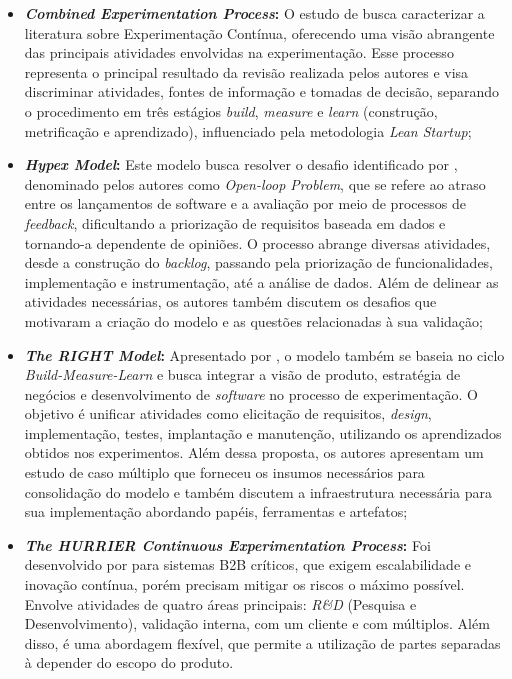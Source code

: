 \begin{itemize}

    \item \textbf{\textit{Combined Experimentation Process}:} O estudo de  busca caracterizar a literatura sobre Experimentação Contínua, oferecendo uma visão abrangente das principais atividades envolvidas na experimentação. Esse processo representa o principal resultado da revisão realizada pelos autores e visa discriminar atividades, fontes de informação e tomadas de decisão, separando o procedimento em três estágios \textit{build}, \textit{measure} e \textit{learn} (construção, metrificação e aprendizado), influenciado pela metodologia \textit{Lean Startup};
    
    \item \textbf{\textit{Hypex Model}:} Este modelo busca resolver o desafio identificado por , denominado pelos autores como \textit{Open-loop Problem}, que se refere ao atraso entre os lançamentos de software e a avaliação por meio de processos de \textit{feedback}, dificultando a priorização de requisitos baseada em dados e tornando-a dependente de opiniões. O processo abrange diversas atividades, desde a construção do \textit{backlog}, passando pela priorização de funcionalidades, implementação e instrumentação, até a análise de dados. Além de delinear as atividades necessárias, os autores também discutem os desafios que motivaram a criação do modelo e as questões relacionadas à sua validação;
    
    \item \textbf{\textit{The RIGHT Model}:} Apresentado por , o modelo também se baseia no ciclo \textit{Build-Measure-Learn} e busca integrar a visão de produto, estratégia de negócios e desenvolvimento de \textit{software} no processo de experimentação. O objetivo é unificar atividades como elicitação de requisitos, \textit{design}, implementação, testes, implantação e manutenção, utilizando os aprendizados obtidos nos experimentos. Além dessa proposta, os autores apresentam um estudo de caso múltiplo que forneceu os insumos necessários para consolidação do modelo e também discutem a infraestrutura necessária para sua implementação abordando papéis, ferramentas e artefatos;
    
    \item \textbf{\textit{The HURRIER Continuous Experimentation Process}:} Foi desenvolvido por  para sistemas B2B críticos, que exigem escalabilidade e inovação contínua, porém precisam mitigar os riscos o máximo possível. Envolve atividades de quatro áreas principais: \textit{R\&D} (Pesquisa e Desenvolvimento), validação interna, com um cliente e com múltiplos. Além disso, é uma abordagem flexível, que permite a utilização de partes separadas à depender do escopo do produto.
\end{itemize}

